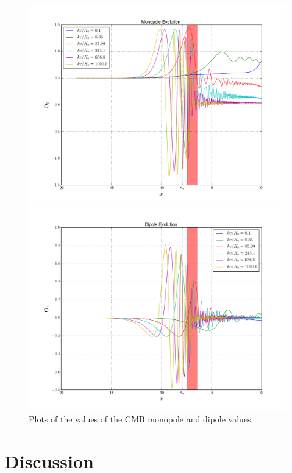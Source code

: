 \documentclass[a4paper]{article}
\begin{document}
\begin{figure}[ht!]
\label{fig:thetas}
\begin{minipage}{0.5\textwidth}
\centering
\includegraphics[width=1.0\linewidth]{theta_0}
\end{minipage}%
\begin{minipage}{0.5\textwidth}
\centering
\includegraphics[width=1.0\linewidth]{theta_1}
\end{minipage}
\caption{Plots of the values of the CMB monopole and dipole values.}\end{figure}

\clearpage

\section{Discussion}\label{sec:disc}
\end{document}
